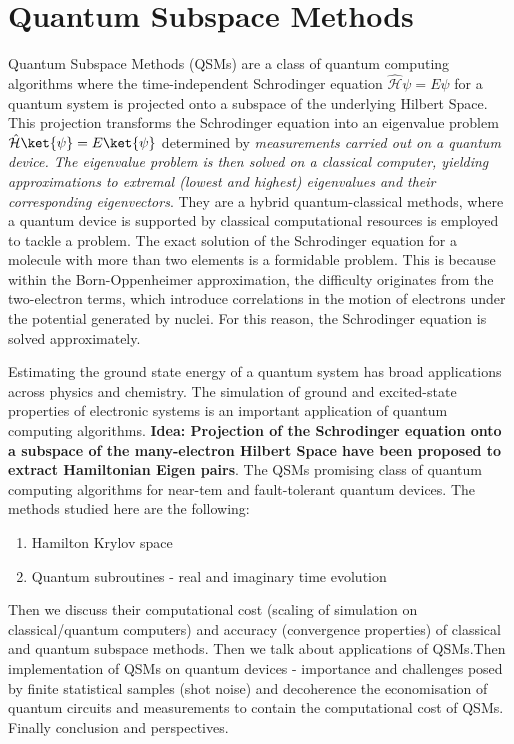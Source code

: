 \documentclass[12pt, oneside]{book}
\theoremstyle{definition}
\theoremstyle{definition}
\theoremstyle{remark}
\begin{document}
\chapter{Quantum Subspace Methods}

Quantum Subspace Methods (QSMs) are a class of quantum computing algorithms where the time-independent Schrodinger equation $\hat{\mathcal{H}}\psi=E\psi$ for a quantum system is projected onto a subspace of the underlying Hilbert Space. This projection transforms the Schrodinger equation into an eigenvalue problem $\hat{\mathcal{H}}\ket{\psi}=E\ket{\psi}$ determined by \textit{measurements carried out on a quantum device. The eigenvalue problem is then solved on a classical computer, yielding approximations to extremal (lowest and highest) eigenvalues and their corresponding eigenvectors}. They are a hybrid quantum-classical methods, where a quantum device is supported by classical computational resources is employed to tackle a problem. The exact solution of the Schrodinger equation for a molecule with more than two elements is a formidable problem. This is because within the Born-Oppenheimer approximation, the difficulty originates from the two-electron terms, which introduce correlations in the motion of electrons under the potential generated by nuclei. For this reason, the Schrodinger equation is solved approximately.

Estimating the ground state energy of a quantum system has broad applications across physics and chemistry. The simulation of ground and excited-state properties of electronic systems is an important application of quantum computing algorithms. \textbf{Idea: Projection of the Schrodinger equation onto a subspace of the many-electron Hilbert Space have been proposed to extract Hamiltonian Eigen pairs}. The QSMs promising class of quantum computing algorithms for near-tem and fault-tolerant quantum devices. The methods studied here are the following:
\begin{enumerate}
    \item Hamilton Krylov space
    \item Quantum subroutines - real and imaginary time evolution
\end{enumerate}
Then we discuss their computational cost (scaling of simulation on classical/quantum computers) and accuracy (convergence properties) of classical and quantum subspace methods. Then we talk about applications of QSMs.Then implementation of QSMs on quantum devices - importance and challenges posed by finite statistical samples (shot noise) and decoherence the economisation of quantum circuits and measurements to contain the computational cost of QSMs. Finally conclusion and perspectives.
\end{document}
